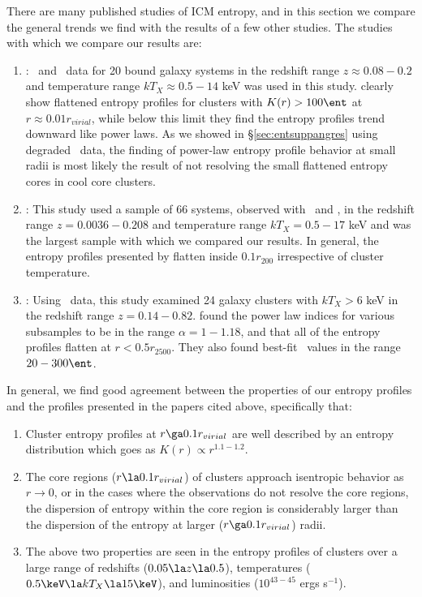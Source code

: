 There are many published studies of ICM entropy, and in this section
we compare the general trends we find with the results of a few other
studies. The studies with which we compare our results are:
\begin{enumerate}
\item \citet{davies00}: \rosat\ and \asca\ data for 20 bound galaxy
  systems in the redshift range $z \approx 0.08-0.2$ and temperature
  range $kT_X \approx 0.5-14$ keV was used in this
  study. \citet{davies00} clearly show flattened entropy profiles for
  clusters with $K(r) > 100 \ent$ at $r \approx 0.01 r_{virial}$,
  while below this limit they find the entropy profiles trend downward
  like power laws. As we showed in \S\ref{sec:entsuppangres} using degraded
  \xmm\ data, the finding of power-law entropy profile behavior at
  small radii is most likely the result of not resolving the small
  flattened entropy cores in cool core clusters.
\item \citet{ponman03}: This study used a sample of 66 systems,
  observed with \rosat\ and \asca, in the redshift range $z=
  0.0036-0.208$ and temperature range $kT_X = 0.5-17$ keV and was the
  largest sample with which we compared our results. In general, the
  entropy profiles presented by \citet{ponman03} flatten inside $0.1
  r_{200}$ irrespective of cluster temperature.
\item \citet{morandi07}: Using \chandra\ data, this study examined 24
  galaxy clusters with $kT_X > 6$ keV in the redshift range
  $z=0.14-0.82$. \citet{morandi07} found the power law indices for
  various subsamples to be in the range $\alpha=1-1.18$, and that all
  of the entropy profiles flatten at $r < 0.5r_{2500}$. They also
  found best-fit \kna\ values in the range $20-300 \ent$.
\end{enumerate}

In general, we find good agreement between the properties of our
entropy profiles and the profiles presented in the papers cited above,
specifically that:
\begin{enumerate}
\item Cluster entropy profiles at $r \ga 0.1 r_{virial}$ are well
  described by an entropy distribution which goes as $K(r) \propto
  r^{1.1-1.2}$.
\item The core regions ($r \la 0.1 r_{virial}$) of clusters approach
  isentropic behavior as $r \rightarrow 0$, or in the cases where the
  observations do not resolve the core regions, the dispersion of
  entropy within the core region is considerably larger than the
  dispersion of the entropy at larger ($r \ga 0.1 r_{virial}$) radii.
\item The above two properties are seen in the entropy profiles of
  clusters over a large range of redshifts ($0.05 \la z \la 0.5$),
  temperatures ($0.5 \keV \la kT_X \la 15 \keV$), and luminosities
  ($10^{43-45}$ ergs s$^{-1}$).
\end{enumerate}  

